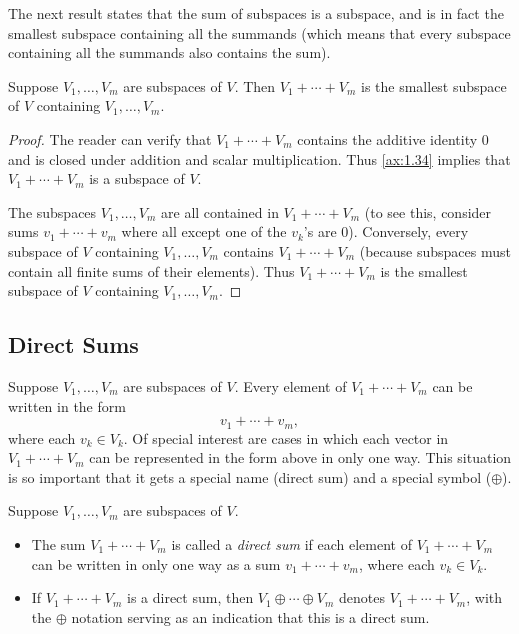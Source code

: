 The next result states that the sum of subspaces is a subspace, and is in fact
the smallest subspace containing all the summands (which means that every
subspace containing all the summands also contains the sum).

\begin{result}\label{ax:1.40}
Suppose $V_1,\dots,V_m$ are subspaces of $V$. Then $V_1+\cdots+V_m$ is the
smallest subspace of $V$ containing $V_1,\dots,V_m$.
\end{result}

\begin{proof}
The reader can verify that $V_1+\cdots+V_m$ contains the additive identity $0$
and is closed under addition and scalar multiplication. Thus \ref{ax:1.34}
implies that $V_1+\cdots+V_m$ is a subspace of $V$.

%
The subspaces $V_1,\dots,V_m$ are all contained in $V_1+\cdots+V_m$ (to see
this, consider sums $v_1+\cdots+v_m$ where all except one of the $v_k$'s are
$0$). Conversely, every subspace of $V$ containing $V_1,\dots,V_m$ contains
$V_1+\cdots+V_m$ (because subspaces must contain all finite sums of their
elements). Thus $V_1+\cdots+V_m$ is the smallest subspace of $V$ containing
$V_1,\dots,V_m$.
\end{proof}

\subsection{Direct Sums}

Suppose $V_1,\dots,V_m$ are subspaces of $V$. Every element of
$V_1+\cdots+V_m$ can be written in the form
\[ v_1+\cdots+v_m, \]
where each $v_k\in V_k$. Of special interest are cases in which each vector in
$V_1+\cdots+V_m$ can be represented in the form above in only one way. This
situation is so important that it gets a special name (direct sum) and a
special symbol ($\oplus$).

\begin{definition}\label{ax:1.41}
Suppose $V_1,\dots,V_m$ are subspaces of $V$.
\begin{itemize}
\item The sum $V_1+\cdots+V_m$ is called a \emph{direct sum} if each element of
  $V_1+\cdots+V_m$ can be written in only one way as a sum $v_1+\cdots+v_m$,
  where each $v_k\in V_k$.
\item If $V_1+\cdots+V_m$ is a direct sum, then $V_1\oplus\cdots\oplus V_m$
  denotes $V_1+\cdots+V_m$, with the $\oplus$ notation serving as an indication
  that this is a direct sum.
\end{itemize}
\end{definition}

